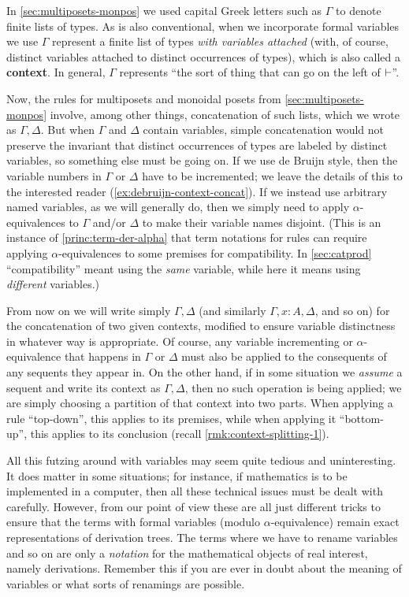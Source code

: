 In \cref{sec:multiposets-monpos} we used capital Greek letters such as $\Gamma$ to denote finite lists of types.
As is also conventional, when we incorporate formal variables we use $\Gamma$ represent a finite list of types \emph{with variables attached} (with, of course, distinct variables attached to distinct occurrences of types), which is also called a \textbf{context}.
In general, $\Gamma$ represents ``the sort of thing that can go on the left of $\vdash$''.

Now, the rules for multiposets and monoidal posets from \cref{sec:multiposets-monpos} involve, among other things, concatenation of such lists, which we wrote as $\Gamma,\Delta$.
But when $\Gamma$ and $\Delta$ contain variables, simple concatenation would not preserve the invariant that distinct occurrences of types are labeled by distinct variables, so something else must be going on.
If we use de Bruijn style, then the variable numbers in $\Gamma$ or $\Delta$ have to be incremented; we leave the details of this to the interested reader (\cref{ex:debruijn-context-concat}).
If we instead use arbitrary named variables, as we will generally do, then we simply need to apply $\alpha$-equivalences to $\Gamma$ and/or $\Delta$ to make their variable names disjoint.
(This is an instance of \cref{princ:term-der-alpha} that term notations for rules can require applying $\alpha$-equivalences to some premises for compatibility.
In \cref{sec:catprod} ``compatibility'' meant using the \emph{same} variable, while here it means using \emph{different} variables.)

From now on we will write simply $\Gamma,\Delta$ (and similarly $\Gamma, x:A, \Delta$, and so on) for the concatenation of two given contexts, modified to ensure variable distinctness in whatever way is appropriate.
Of course, any variable incrementing or $\alpha$-equivalence that happens in $\Gamma$ or $\Delta$ must also be applied to the consequents of any sequents they appear in.
On the other hand, if in some situation we \emph{assume} a sequent and write its context as $\Gamma,\Delta$, then no such operation is being applied; we are simply choosing a partition of that context into two parts.
When applying a rule ``top-down'', this applies to its premises, while when applying it ``bottom-up'', this applies to its conclusion (recall \cref{rmk:context-splitting-1}).

All this futzing around with variables may seem quite tedious and uninteresting.
It does matter in some situations; for instance, if mathematics is to be implemented in a computer, then all these technical issues must be dealt with carefully.
However, from our point of view these are all just different tricks to ensure that the terms with formal variables (modulo $\alpha$-equivalence) remain exact representations of derivation trees.
The terms where we have to rename variables and so on are only a \emph{notation} for the mathematical objects of real interest, namely derivations.
Remember this if you are ever in doubt about the meaning of variables or what sorts of renamings are possible.

